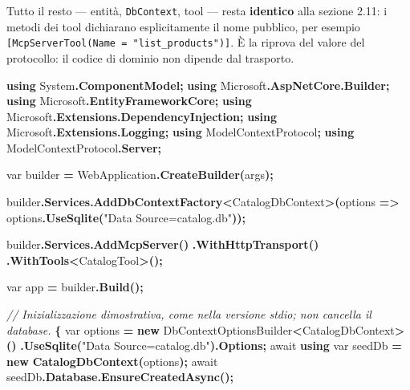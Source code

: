\documentclass[
  italian,
  10pt,
]{book}
\newenvironment{Shaded}{\begin{snugshade}}{\end{snugshade}}
\newcommand{\CommentTok}[1]{\textcolor[rgb]{0.56,0.35,0.01}{\textit{#1}}}
\newcommand{\DataTypeTok}[1]{\textcolor[rgb]{0.13,0.29,0.53}{#1}}
\newcommand{\FunctionTok}[1]{\textcolor[rgb]{0.13,0.29,0.53}{\textbf{#1}}}
\newcommand{\KeywordTok}[1]{\textcolor[rgb]{0.13,0.29,0.53}{\textbf{#1}}}
\newcommand{\NormalTok}[1]{#1}
\newcommand{\OperatorTok}[1]{\textcolor[rgb]{0.81,0.36,0.00}{\textbf{#1}}}
\newcommand{\StringTok}[1]{\textcolor[rgb]{0.31,0.60,0.02}{#1}}
\begin{document}
Tutto il resto --- entità, \texttt{DbContext}, tool --- resta
\textbf{identico} alla sezione 2.11: i metodi dei tool dichiarano
esplicitamente il nome pubblico, per esempio
\texttt{{[}McpServerTool(Name\ =\ "list\_products"){]}}. È la riprova
del valore del protocollo: il codice di dominio non dipende dal
trasporto.

\begin{Shaded}
\begin{Highlighting}[]
\KeywordTok{using}\NormalTok{ System}\OperatorTok{.}\FunctionTok{ComponentModel}\OperatorTok{;}
\KeywordTok{using}\NormalTok{ Microsoft}\OperatorTok{.}\FunctionTok{AspNetCore}\OperatorTok{.}\FunctionTok{Builder}\OperatorTok{;}
\KeywordTok{using}\NormalTok{ Microsoft}\OperatorTok{.}\FunctionTok{EntityFrameworkCore}\OperatorTok{;}
\KeywordTok{using}\NormalTok{ Microsoft}\OperatorTok{.}\FunctionTok{Extensions}\OperatorTok{.}\FunctionTok{DependencyInjection}\OperatorTok{;}
\KeywordTok{using}\NormalTok{ Microsoft}\OperatorTok{.}\FunctionTok{Extensions}\OperatorTok{.}\FunctionTok{Logging}\OperatorTok{;}
\KeywordTok{using}\NormalTok{ ModelContextProtocol}\OperatorTok{;}
\KeywordTok{using}\NormalTok{ ModelContextProtocol}\OperatorTok{.}\FunctionTok{Server}\OperatorTok{;}

\DataTypeTok{var}\NormalTok{ builder }\OperatorTok{=}\NormalTok{ WebApplication}\OperatorTok{.}\FunctionTok{CreateBuilder}\OperatorTok{(}\NormalTok{args}\OperatorTok{);}

\NormalTok{builder}\OperatorTok{.}\FunctionTok{Services}\OperatorTok{.}\FunctionTok{AddDbContextFactory}\OperatorTok{\textless{}}\NormalTok{CatalogDbContext}\OperatorTok{\textgreater{}(}\NormalTok{options }\OperatorTok{=\textgreater{}}
\NormalTok{    options}\OperatorTok{.}\FunctionTok{UseSqlite}\OperatorTok{(}\StringTok{"Data Source=catalog.db"}\OperatorTok{));}

\NormalTok{builder}\OperatorTok{.}\FunctionTok{Services}\OperatorTok{.}\FunctionTok{AddMcpServer}\OperatorTok{()}
    \OperatorTok{.}\FunctionTok{WithHttpTransport}\OperatorTok{()}
    \OperatorTok{.}\FunctionTok{WithTools}\OperatorTok{\textless{}}\NormalTok{CatalogTool}\OperatorTok{\textgreater{}();}

\DataTypeTok{var}\NormalTok{ app }\OperatorTok{=}\NormalTok{ builder}\OperatorTok{.}\FunctionTok{Build}\OperatorTok{();}

\CommentTok{// Inizializzazione dimostrativa, come nella versione stdio; non cancella il database.}
\OperatorTok{\{}
    \DataTypeTok{var}\NormalTok{ options }\OperatorTok{=} \KeywordTok{new}\NormalTok{ DbContextOptionsBuilder}\OperatorTok{\textless{}}\NormalTok{CatalogDbContext}\OperatorTok{\textgreater{}()}
        \OperatorTok{.}\FunctionTok{UseSqlite}\OperatorTok{(}\StringTok{"Data Source=catalog.db"}\OperatorTok{).}\FunctionTok{Options}\OperatorTok{;}
\NormalTok{    await }\KeywordTok{using} \DataTypeTok{var}\NormalTok{ seedDb }\OperatorTok{=} \KeywordTok{new} \FunctionTok{CatalogDbContext}\OperatorTok{(}\NormalTok{options}\OperatorTok{);}
\NormalTok{    await seedDb}\OperatorTok{.}\FunctionTok{Database}\OperatorTok{.}\FunctionTok{EnsureCreatedAsync}\OperatorTok{();}


\end{Highlighting}
\end{Shaded}
\end{document}

